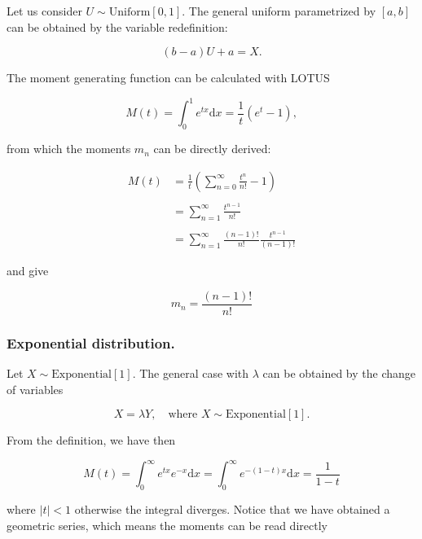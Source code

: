 \documentclass[12pt]{article}
\begin{document}
Let us consider $U \sim \text{Uniform}[0,1]$. The general uniform parametrized by 
$[a,b]$ can be obtained by the variable redefinition:

\begin{equation}
(b - a) U + a = X.
\end{equation}

The moment generating function can be calculated with LOTUS

\begin{equation}
M(t) = \int_{0}^{1} e^{tx} \mathrm{d} x = \frac{1}{t} \left( e^{t} - 1 \right),
\end{equation}

\noindent
from which the moments $m_{n}$ can be directly derived:

\begin{align}
M(t) &= \frac{1}{t} \left( \sum_{n=0}^{\infty} \frac{t^{n}}{n!} - 1 \right) 
\nonumber \\
\nonumber \\
&= \sum_{n = 1}^{\infty} \frac{t^{n-1}}{n!}
\nonumber \\
\nonumber \\
&= \sum_{n=1}^{\infty} \frac{(n-1)!}{n!} \frac{t^{n-1}}{(n-1)!}
\end{align}

\noindent
and give

\begin{equation}
m_{n} = 
\frac{(n-1)!}{n!}
\end{equation}

\subsubsection{Exponential distribution.}

Let $X \sim \text{Exponential}[1]$. 
The general case with $\lambda$ can be obtained by the 
change of variables

\begin{equation} \label{expredef}
X = \lambda Y, 
\quad
\text{where }
X \sim \text{Exponential}[1].
\end{equation}

From the definition, we have then

\begin{equation}
M(t) = \int_{0}^{\infty} e^{tx} e^{-x} \mathrm{d}x = 
\int_{0}^{\infty} e^{-(1-t)x} \mathrm{d} x = \frac{1}{1 - t}
\end{equation}

\noindent
where $|t| < 1$ otherwise the integral diverges.
Notice that we have obtained a geometric series,
which means the moments can be read directly
\end{document}
